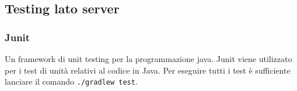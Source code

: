 \subsection{Testing lato server}
\subsubsection{Junit}
Un framework di unit testing per la programmazione java. Junit viene utilizzato per i test di unità relativi al codice in Java.
Per eseguire tutti i test è sufficiente lanciare il comando \texttt{./gradlew test}.
